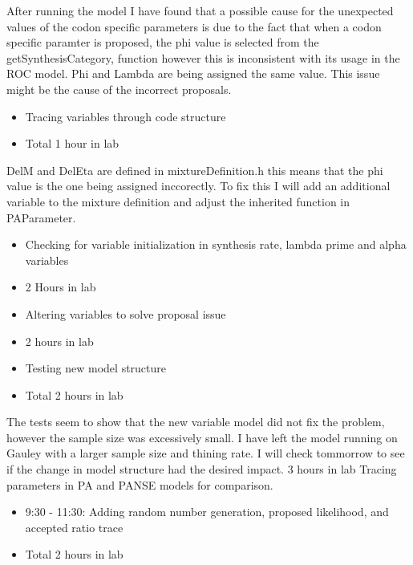 \documentclass[12pt,hyperref]{labbook}
\begin{document}
After running the model I have found that a possible cause for the unexpected values of the codon specific parameters
is due to the fact that when a codon specific paramter is proposed, the phi value is selected from the getSynthesisCategory, function
however this is inconsistent with its usage in the ROC model. Phi and Lambda are being assigned the same value. This issue might
be the cause of the incorrect proposals.
\begin{itemize}
    \item Tracing variables through code structure
    \item Total 1 hour in lab
\end{itemize}
DelM and DelEta are defined in mixtureDefinition.h this means that the phi value is the one being assigned inccorectly. To fix this
I will add an additional variable to the mixture definition and adjust the inherited function in PAParameter.
\begin{itemize}
    \item Checking for variable initialization in synthesis rate, lambda prime and alpha variables
    \item 2 Hours in lab
\end{itemize}
\begin{itemize}
    \item Altering variables to solve proposal issue
    \item 2 hours in lab
\end{itemize}
\begin{itemize}
    \item Testing new model structure
    \item Total 2 hours in lab
\end{itemize}
The tests seem to show that the new variable model did not fix the problem, however the sample size was excessively small.
I have left the model running on Gauley with a larger sample size and thining rate. I will check tommorrow to see if the change in
model structure had the desired impact.
3 hours in lab
Tracing parameters in PA and PANSE models for comparison.
\begin{itemize}
    \item 9:30 - 11:30: Adding random number generation, proposed likelihood, and accepted ratio trace
    \item Total 2 hours in lab
\end{itemize}
\end{document}
